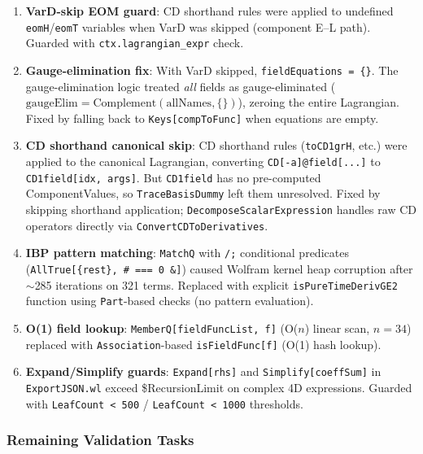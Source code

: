 \begin{enumerate}
  \item \textbf{VarD-skip EOM guard}: CD shorthand rules were applied to undefined \texttt{eomH}/\texttt{eomT} variables when VarD was skipped (component E--L path).  Guarded with \texttt{ctx.lagrangian\_expr} check.

  \item \textbf{Gauge-elimination fix}: With VarD skipped, \texttt{fieldEquations = \{\}}.  The gauge-elimination logic treated \emph{all} fields as gauge-eliminated ($\text{gaugeElim} = \text{Complement}(\text{allNames}, \{\})$), zeroing the entire Lagrangian.  Fixed by falling back to \texttt{Keys[compToFunc]} when equations are empty.

  \item \textbf{CD shorthand canonical skip}: CD shorthand rules (\texttt{toCD1grH}, etc.) were applied to the canonical Lagrangian, converting \texttt{CD[-a]@field[...]} to \texttt{CD1field[idx, args]}.  But \texttt{CD1field} has no pre-computed ComponentValues, so \texttt{TraceBasisDummy} left them unresolved.  Fixed by skipping shorthand application; \texttt{DecomposeScalarExpression} handles raw CD operators directly via \texttt{ConvertCDToDerivatives}.

  \item \textbf{IBP pattern matching}: \texttt{MatchQ} with \texttt{/;} conditional predicates (\texttt{AllTrue[\{rest\}, \# === 0 \&]}) caused Wolfram kernel heap corruption after $\sim$285 iterations on 321 terms.  Replaced with explicit \texttt{isPureTimeDerivGE2} function using \texttt{Part}-based checks (no pattern evaluation).

  \item \textbf{O(1) field lookup}: \texttt{MemberQ[fieldFuncList, f]} (O($n$) linear scan, $n{=}34$) replaced with \texttt{Association}-based \texttt{isFieldFunc[f]} (O(1) hash lookup).

  \item \textbf{Expand/Simplify guards}: \texttt{Expand[rhs]} and \texttt{Simplify[coeffSum]} in \texttt{ExportJSON.wl} exceed \$RecursionLimit on complex 4D expressions.  Guarded with \texttt{LeafCount < 500} / \texttt{LeafCount < 1000} thresholds.
\end{enumerate}

\subsubsection{Remaining Validation Tasks}

